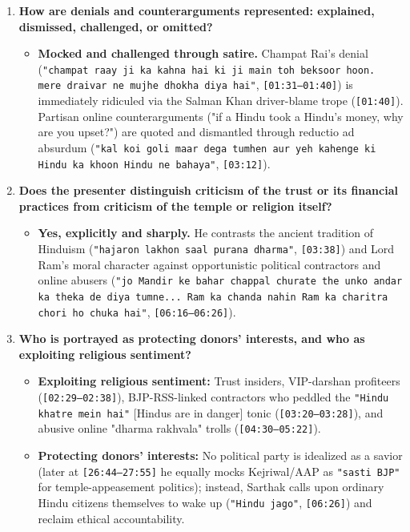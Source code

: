 \documentclass[10pt,a4paper]{article}
\begin{document}
\begin{enumerate}[leftmargin=1.6em, itemsep=4pt, topsep=4pt]
\begin{itemize}[leftmargin=1.4em, itemsep=2pt, topsep=2pt]
  \end{itemize}
  \item \textbf{How are denials and counterarguments represented: explained, dismissed, challenged, or omitted?}
  \begin{itemize}[leftmargin=1.4em, itemsep=2pt, topsep=2pt]
    \item \textbf{Mocked and challenged through satire.} Champat Rai's denial (\texttt{"champat raay ji ka kahna hai ki ji main toh beksoor hoon. mere draivar ne mujhe dhokha diya hai"}, \texttt{[01:31--01:40]}) is immediately ridiculed via the Salman Khan driver-blame trope (\texttt{[01:40]}). Partisan online counterarguments ("if a Hindu took a Hindu's money, why are you upset?") are quoted and dismantled through reductio ad absurdum (\texttt{"kal koi goli maar dega tumhen aur yeh kahenge ki Hindu ka khoon Hindu ne bahaya"}, \texttt{[03:12]}).
  \end{itemize}
  \item \textbf{Does the presenter distinguish criticism of the trust or its financial practices from criticism of the temple or religion itself?}
  \begin{itemize}[leftmargin=1.4em, itemsep=2pt, topsep=2pt]
    \item \textbf{Yes, explicitly and sharply.} He contrasts the ancient tradition of Hinduism (\texttt{"hajaron lakhon saal purana dharma"}, \texttt{[03:38]}) and Lord Ram's moral character against opportunistic political contractors and online abusers (\texttt{"jo Mandir ke bahar chappal churate the unko andar ka theka de diya tumne... Ram ka chanda nahin Ram ka charitra chori ho chuka hai"}, \texttt{[06:16--06:26]}).
  \end{itemize}
  \item \textbf{Who is portrayed as protecting donors' interests, and who as exploiting religious sentiment?}
  \begin{itemize}[leftmargin=1.4em, itemsep=2pt, topsep=2pt]
    \item \textbf{Exploiting religious sentiment:} Trust insiders, VIP-darshan profiteers (\texttt{[02:29--02:38]}), BJP-RSS-linked contractors who peddled the \texttt{"Hindu khatre mein hai"} [Hindus are in danger] tonic (\texttt{[03:20--03:28]}), and abusive online "dharma rakhvala" trolls (\texttt{[04:30--05:22]}).
    \item \textbf{Protecting donors' interests:} No political party is idealized as a savior (later at \texttt{[26:44--27:55]} he equally mocks Kejriwal/AAP as \texttt{"sasti BJP"} for temple-appeasement politics); instead, Sarthak calls upon ordinary Hindu citizens themselves to wake up (\texttt{"Hindu jago"}, \texttt{[06:26]}) and reclaim ethical accountability.
  \end{itemize}
\end{enumerate}
\end{document}
